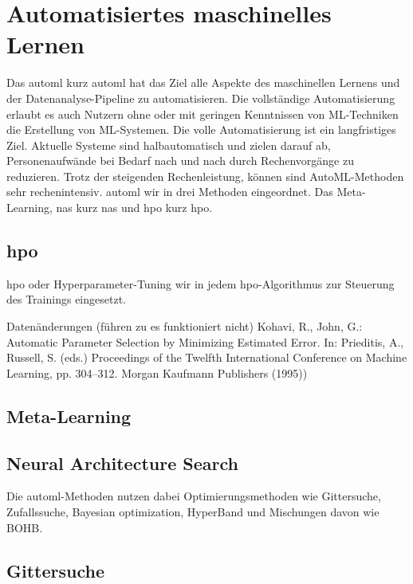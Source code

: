 		\cite{Thung.2018} \cite{Pan.2010}

	\section{Automatisiertes maschinelles Lernen}
	\label{sec:AutoML}
	 Das \acl{automl} kurz \ac{automl} hat das Ziel alle Aspekte des maschinellen Lernens und der Datenanalyse-Pipeline zu automatisieren. Die vollständige Automatisierung erlaubt es auch Nutzern ohne oder mit geringen Kenntnissen von ML-Techniken die Erstellung von ML-Systemen. 
	Die volle Automatisierung ist ein langfristiges Ziel. Aktuelle Systeme sind halbautomatisch und zielen darauf ab, Personenaufwände bei Bedarf nach und nach durch Rechenvorgänge zu reduzieren. Trotz der steigenden Rechenleistung, können sind AutoML-Methoden sehr rechenintensiv.  \ac{automl} wir in drei Methoden eingeordnet. Das Meta-Learning, \acl{nas} kurz \ac{nas} und \acl{hpo} kurz \ac{hpo}. \cite{Hutter.2019} 
	
	\subsection{\acl{hpo}}	
	\acl{hpo} oder Hyperparameter-Tuning wir in jedem \ac{hpo}-Algorithmus zur Steuerung des Trainings eingesetzt. 
	
	\cite{Kohavi.}
	
	\cite{Feurer.2019}		
	
		Datenänderungen (führen zu es funktioniert nicht)
	Kohavi, R., John, G.: Automatic Parameter Selection by Minimizing Estimated Error. In:
	Prieditis, A., Russell, S. (eds.) Proceedings of the Twelfth International Conference on
	Machine Learning, pp. 304–312. Morgan Kaufmann Publishers (1995))
	
	\subsection{Meta-Learning}
		\cite{JoaquinVanschoren.2018}
		\cite{Vanschoren.2019}
	\subsection{Neural Architecture Search}
	\cite{Elsken.2019}	

	Die \ac{automl}-Methoden nutzen dabei Optimierungsmethoden wie Gittersuche, Zufallssuche, Bayesian optimization, HyperBand und Mischungen davon wie BOHB. 

	\subsection{Gittersuche}
			\cite{Michelucci.2018}
